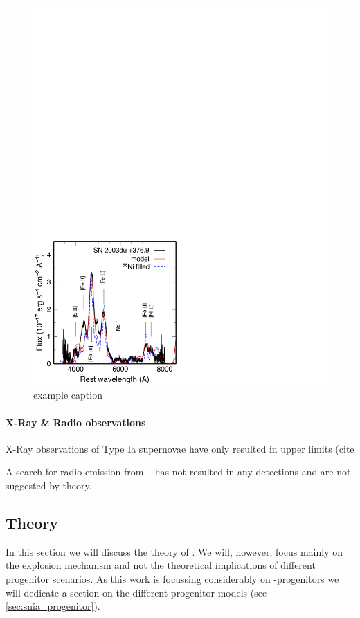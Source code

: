 \begin{figure}[htbp] %
   \centering
   \includegraphics[width=\textwidth]{chapter_intro/plots/sn2003du_nebular.pdf} 
   \caption{example caption}
   \label{fig:sn2003du_nebular}
\end{figure}


\paragraph{X-Ray \& Radio observations}
X-Ray observations of Type Ia supernovae have only resulted in upper limits (cite

A search for radio emission from \sneia\ \citep{2006ApJ...646..369P} has not resulted in any detections and are not suggested by theory.


\subsection{Theory}
In this section we will discuss the theory of \sneia. We will, however, focus mainly on the explosion mechanism and not the theoretical implications of different progenitor scenarios. As this work is focussing considerably on \snia-progenitors we will dedicate a section on the different progenitor models (see \ref{sec:snia_progenitor}).


